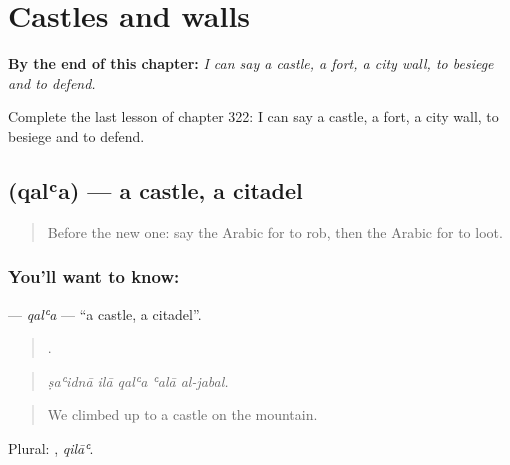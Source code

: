 
\chapter{Castles and walls}
\label{ch:ar-castles-and-walls}

\begin{chapteropening}
\textbf{By the end of this chapter:} \emph{I can say a castle, a fort, a city wall, to besiege and to defend.}

Complete the last lesson of chapter 322: I can say a castle, a fort, a city wall, to besiege and to defend.
\end{chapteropening}

\section[\texorpdfstring{\ar{قلعة} (qalʿa)}{قلعة (qalʿa)}]{ (qalʿa) — a castle, a citadel}

\label{lesson:AR-C322-qala}



\begin{quote}
Before the new one: say the Arabic for to rob, then the Arabic for to loot.
\end{quote}

\subsection*{You'll want to know: }
\textbf{} — \emph{qalʿa} — \textquotedblleft{}a castle, a citadel\textquotedblright{}.

\begin{quote}
    .
\end{quote}

\begin{quote}
\emph{ṣaʿidnā ilā qalʿa ʿalā al-jabal.}
\end{quote}

\begin{quote}
We climbed up to a castle on the mountain.
\end{quote}

Plural: , \emph{qilāʿ}.

